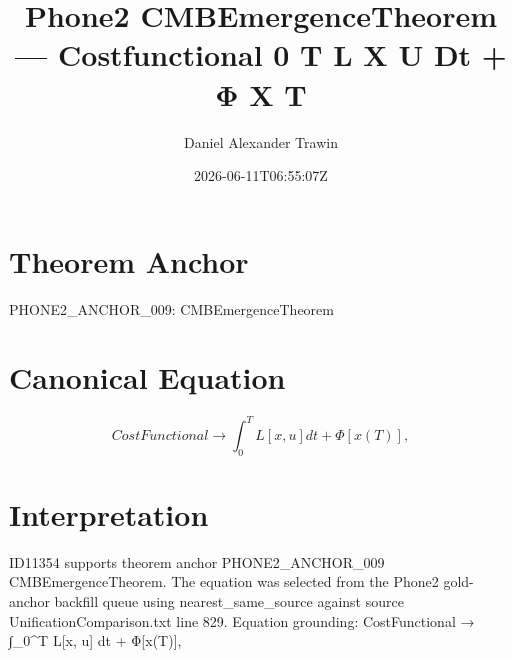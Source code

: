 \documentclass[11pt]{article}
\title{Phone2 CMBEmergenceTheorem — Costfunctional 0 T L X U Dt + Φ X T}
\author{Daniel Alexander Trawin}
\date{2026-06-11T06:55:07Z}
\begin{document}
\maketitle
\section*{Theorem Anchor}
PHONE2_ANCHOR_009: CMBEmergenceTheorem
\section*{Canonical Equation}
\[
CostFunctional → ∫_0^T L[x, u] dt + Φ[x(T)],
\]
\section*{Interpretation}
ID11354 supports theorem anchor PHONE2_ANCHOR_009 CMBEmergenceTheorem. The equation was selected from the Phone2 gold-anchor backfill queue using nearest_same_source against source UnificationComparison.txt line 829. Equation grounding: CostFunctional → ∫_0^T L[x, u] dt + Φ[x(T)],
\end{document}
